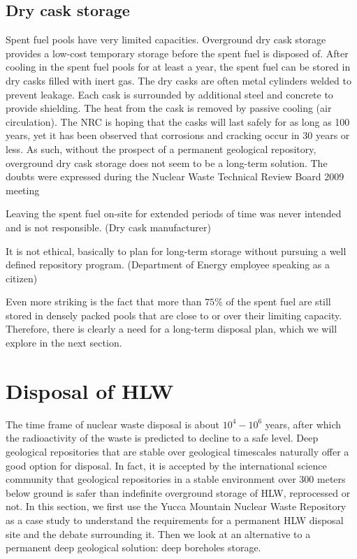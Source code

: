 \documentclass[nofootinbib,preprint,aip,pra]{revtex4-1}
\begin{document}
    \subsection{Dry cask storage}
    Spent fuel pools have very limited capacities. 
    Overground dry cask storage provides a low-cost temporary storage before the spent fuel is disposed of.
    After cooling in the spent fuel pools for at least a year, the spent fuel can be stored in dry casks filled with inert gas. 
The dry casks are often metal cylinders welded to prevent leakage. Each cask is surrounded by
    additional steel and concrete to provide shielding.
    The heat from the cask is removed by passive
    cooling (air circulation). The NRC is hoping that the casks will
    last safely for as long as 100 years, yet it has been observed that corrosions and cracking occur in 30 years
    or less.\cite{aa12} As such, without the prospect of a permanent geological repository,
    overground dry cask storage does not seem to be a long-term solution. The doubts were expressed
    during the Nuclear Waste Technical Review Board 2009 meeting \cite{nwtb09, aa12}
    \begin{displayquote}
    Leaving the spent fuel on-site for extended periods of time was never intended and is not
    responsible. (Dry cask manufacturer)

    It is not ethical, basically to plan for long-term storage without pursuing a well defined repository
    program. (Department of Energy employee speaking as a citizen)
    \end{displayquote}
    Even more striking is the fact that more than $75\%$ of the spent fuel are still stored in densely
    packed pools
    that are close to or over their limiting capacity.\cite{a11,aa12}
    Therefore, there is clearly a need for a long-term disposal plan, which we will explore in
    the next section.

\section{Disposal of HLW}
\label{sec:disposal}
    The time frame of nuclear waste disposal is about $10^4-10^6$ years, after which the radioactivity
    of the waste is predicted to decline to a safe level.
    Deep geological repositories that are stable over geological timescales naturally offer a good option for disposal.
    In fact, it is accepted by the international science community that geological repositories in a stable environment over 300 meters below ground
    is safer than indefinite overground storage of HLW, reprocessed or not.\cite{fmr11}
    In this section, we first use the Yucca Mountain Nuclear Waste
    Repository as a case study to understand the requirements for a permanent HLW disposal site and the debate
    surrounding it.
    Then we look at an alternative to a permanent deep geological solution:
    deep boreholes storage.
\end{document}
